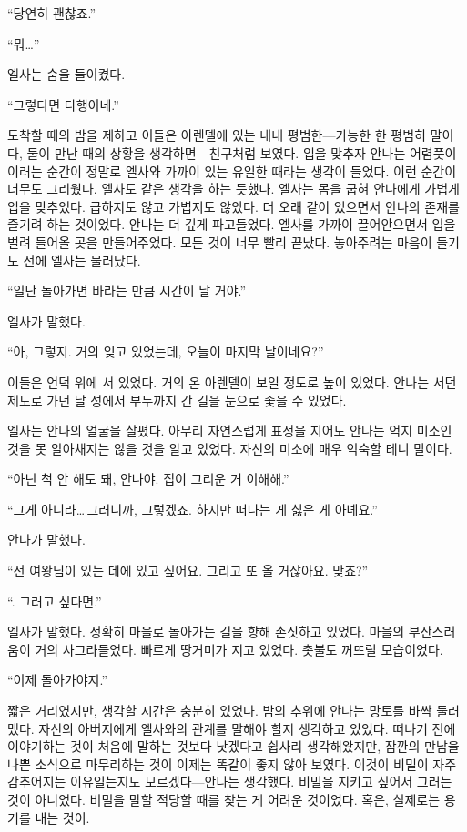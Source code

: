 ``당연히 괜찮죠.''

``뭐\ldots''

엘사는 숨을 들이켰다.

``그렇다면 다행이네.''

도착할 때의 밤을 제하고 이들은 아렌델에 있는 내내 평범한—가능한 한 평범히 말이다, 둘이 만난 때의 상황을 생각하면—친구처럼 보였다. 입을 맞추자 안나는 어렴풋이 이러는 순간이 정말로 엘사와 가까이 있는 유일한 때라는 생각이 들었다. 이런 순간이 너무도 그리웠다. 엘사도 같은 생각을 하는 듯했다. 엘사는 몸을 굽혀 안나에게 가볍게 입을 맞추었다. 급하지도 않고 가볍지도 않았다. 더 오래 같이 있으면서 안나의 존재를 즐기려 하는 것이었다. 안나는 더 깊게 파고들었다. 엘사를 가까이 끌어안으면서 입을 벌려 들어올 곳을 만들어주었다. 모든 것이 너무 빨리 끝났다. 놓아주려는 마음이 들기도 전에 엘사는 물러났다.

``일단 돌아가면 바라는 만큼 시간이 날 거야.''

엘사가 말했다.

``아, 그렇지. 거의 잊고 있었는데, 오늘이 마지막 날이네요?''

이들은 언덕 위에 서 있었다. 거의 온 아렌델이 보일 정도로 높이 있었다. 안나는 서던 제도로 가던 날 성에서 부두까지 간 길을 눈으로 좇을 수 있었다.

엘사는 안나의 얼굴을 살폈다. 아무리 자연스럽게 표정을 지어도 안나는 억지 미소인 것을 못 알아채지는 않을 것을 알고 있었다. 자신의 미소에 매우 익숙할 테니 말이다.

``아닌 척 안 해도 돼, 안나야. 집이 그리운 거 이해해.''

``그게 아니라\ldots\,그러니까, 그렇겠죠. 하지만 떠나는 게 싫은 게 아녜요.''

안나가 말했다.

``전 여왕님이 있는 데에 있고 싶어요. 그리고 또 올 거잖아요. 맞죠?''

``. 그러고 싶다면.''

엘사가 말했다. 정확히 마을로 돌아가는 길을 향해 손짓하고 있었다. 마을의 부산스러움이 거의 사그라들었다. 빠르게 땅거미가 지고 있었다. 촛불도 꺼뜨릴 모습이었다.

``이제 돌아가야지.''

짧은 거리였지만, 생각할 시간은 충분히 있었다. 밤의 추위에 안나는 망토를 바싹 둘러멨다. 자신의 아버지에게 엘사와의 관계를 말해야 할지 생각하고 있었다. 떠나기 전에 이야기하는 것이 처음에 말하는 것보다 낫겠다고 쉽사리 생각해왔지만, 잠깐의 만남을 나쁜 소식으로 마무리하는 것이 이제는 똑같이 좋지 않아 보였다. 이것이 비밀이 자주 감추어지는 이유일는지도 모르겠다—안나는 생각했다. 비밀을 지키고 싶어서 그러는 것이 아니었다. 비밀을 말할 적당할 때를 찾는 게 어려운 것이었다. 혹은, 실제로는 용기를 내는 것이.

